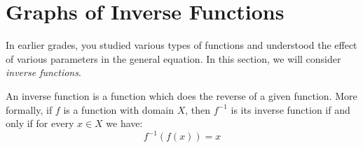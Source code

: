 \section{Graphs of Inverse Functions}
\label{mf:inverses}


In earlier grades, you studied various types of functions and understood the effect of various parameters in the general equation. In this section, we will consider \textit{inverse functions}.

An inverse function is a function which does the reverse of a given function. More formally, if $f$ is a function with domain $X$, then $f^{-1}$ is its inverse function if and only if for every $x \in X$ we have:
\begin{equation}
f^{-1}(f(x))=x
\end{equation}

